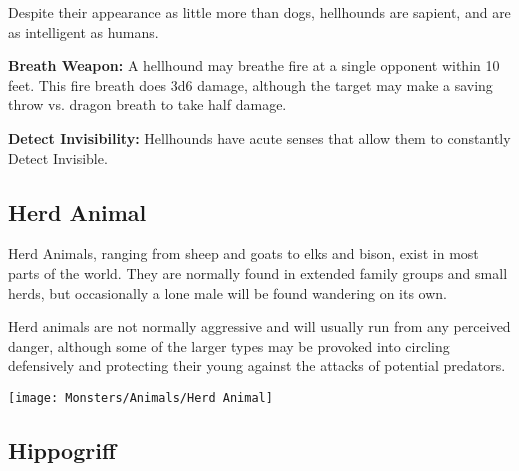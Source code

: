 \begin{multicols*}{2}
Despite their appearance as little more than dogs, hellhounds are sapient, and are as intelligent as humans.

\textbf{Breath Weapon:} A hellhound may breathe fire at a single opponent within 10 feet. This fire breath does 3d6 damage, although the target may make a saving throw vs. dragon breath to take half damage.

\textbf{Detect Invisibility:} Hellhounds have acute senses that allow them to constantly Detect Invisible.

\subsection{Herd Animal}

Herd Animals, ranging from sheep and goats to elks and bison, exist in most parts of the world. They are normally found in extended family groups and small herds, but occasionally a lone male will be found wandering on its own.

Herd animals are not normally aggressive and will usually run from any perceived danger, although some of the larger types may be provoked into circling defensively and protecting their young against the attacks of potential predators.

\texttt{[image: Monsters/Animals/Herd Animal]}

\subsection{Hippogriff}\label{monster:Hippogriff}
\end{multicols*}
